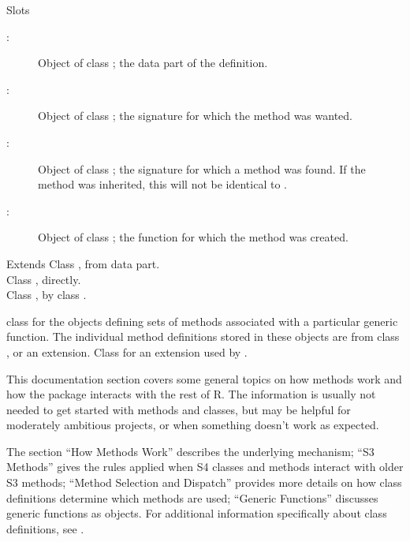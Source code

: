 \begin{Section}{Slots}
\begin{description}

\item[:] Object of class ; the data
part of the definition. 
\item[:] Object of class ; the
signature for which the method was wanted. 
\item[:] Object of class ; the
signature for which a method was found.  If the method was
inherited, this will not be identical to . 
\item[:] Object of class ; the function
for which the method was created. 

\end{description}

\end{Section}
%
\begin{Section}{Extends}
Class , from data part.\\{}
Class , directly.\\{}
Class , by class .
\end{Section}
%
\begin{SeeAlso}\relax
class  for the objects
defining sets of methods associated with a particular generic
function.  The individual method definitions stored in these objects
are from class , or an extension.
Class  for an extension used by
.
\end{SeeAlso}
%
\begin{Description}\relax
This documentation section covers some general topics on how methods
work and how the  package interacts with the rest of R.  The
information is usually not needed to get started with methods and
classes, but may be helpful for moderately ambitious projects, or when
something doesn't work as expected.

The section ``How Methods Work'' describes the underlying
mechanism; ``S3 Methods'' gives the rules applied when S4
classes and methods interact with older S3 methods; ``Method Selection and Dispatch'' provides more
details on how class definitions determine which methods are used;
``Generic Functions'' discusses generic functions as objects.
For additional information specifically about class definitions, see .
\end{Description}
